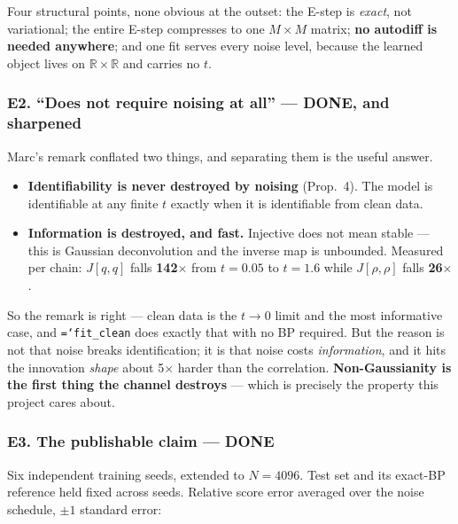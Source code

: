 \documentclass[11pt,a4paper]{article}
\newcommand{\done}{\textcolor{GoodGreen}{\textbf{DONE}}}
\newcommand{\code}[1]{\texttt{\small\hyphenchar\font=`\-\relax #1}}
\begin{document}
Four structural points, none obvious at the outset: the E-step is \emph{exact}, not
variational; the entire E-step compresses to one $M\times M$ matrix; \textbf{no autodiff is
needed anywhere}; and one fit serves every noise level, because the learned object lives on
$\mathbb{R}\times\mathbb{R}$ and carries no $t$.

\subsubsection*{E2. ``Does not require noising at all'' --- \done, and sharpened}

Marc's remark conflated two things, and separating them is the useful answer.

\begin{itemize}
\item \textbf{Identifiability is never destroyed by noising} (Prop.~4). The model is
identifiable at any finite $t$ exactly when it is identifiable from clean data.
\item \textbf{Information is destroyed, and fast.} Injective does not mean stable --- this is
Gaussian deconvolution and the inverse map is unbounded. Measured per chain: $J[q,q]$ falls
\textbf{142$\times$} from $t=0.05$ to $t=1.6$ while $J[\rho,\rho]$ falls \textbf{26$\times$}.
\end{itemize}

\noindent
So the remark is right --- clean data is the $t\to 0$ limit and the most informative case,
and \code{fit\_clean} does exactly that with no BP required. But the reason is not that
noise breaks identification; it is that noise costs \emph{information}, and it hits the
innovation \emph{shape} about 5$\times$ harder than the correlation.
\textbf{Non-Gaussianity is the first thing the channel destroys} --- which is precisely the
property this project cares about.

\subsubsection*{E3. The publishable claim --- \done}

Six independent training seeds, extended to $N=4096$. Test set and its exact-BP reference
held fixed across seeds. Relative score error averaged over the noise schedule, $\pm 1$
standard error:
\end{document}
